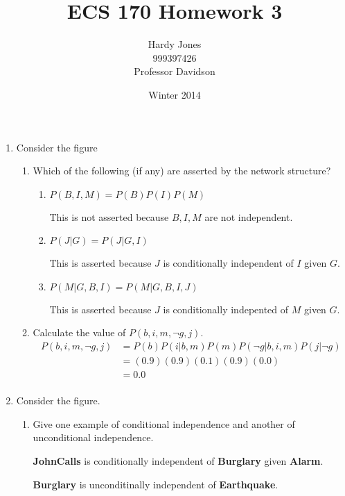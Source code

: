 \documentclass[12pt,letterpaper]{article}
\title{ECS 170 Homework 3\vspace{-2ex}}
\author{Hardy Jones\\
        999397426\\
        Professor Davidson\vspace{-2ex}}
\date{Winter 2014}
\begin{document}
  \maketitle

  \begin{enumerate}
    \item
      Consider the figure
      \begin{enumerate}
        \item Which of the following (if any) are asserted by the network structure?
          \begin{enumerate}
            \item $P(B,I,M) = P(B)P(I)P(M)$

              This is not asserted because $B, I, M$ are not independent.
            \item $P(J|G) = P(J|G,I)$

              This is asserted because $J$ is conditionally independent of $I$ given $G$.
            \item $P(M|G,B,I) = P(M|G,B,I,J)$

              This is asserted because $J$ is conditionally indepented of $M$ given $G$.
          \end{enumerate}

        \item Calculate the value of $P(b,i,m,\neg g,j)$.
          \begin{align*}
            P(b,i,m,\neg g,j) &= P(b)P(i|b,m)P(m)P(\neg g|b,i,m)P(j|\neg g)\\
            &= (0.9)(0.9)(0.1)(0.9)(0.0)\\
            &= 0.0\\
          \end{align*}
      \end{enumerate}
    \item Consider the figure.
      \begin{enumerate}
        \item Give one example of conditional independence and another of unconditional independence.

        \textbf{JohnCalls} is conditionally independent of \textbf{Burglary} given \textbf{Alarm}.

        \textbf{Burglary} is unconditinally independent of \textbf{Earthquake}.
      \end{enumerate}
  \end{enumerate}
\end{document}
